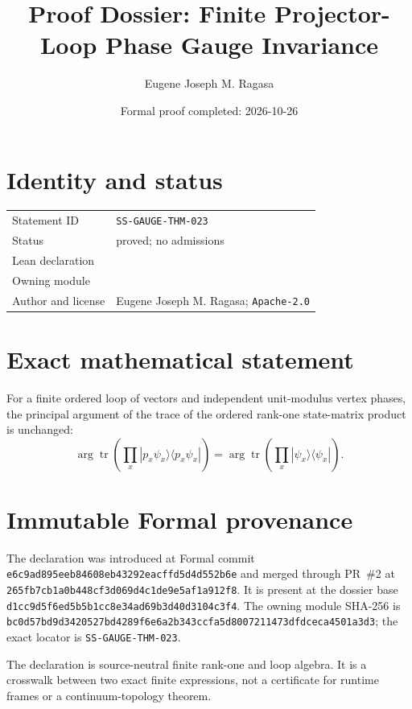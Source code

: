 \documentclass[11pt]{article}
\title{Proof Dossier: Finite Projector-Loop Phase Gauge Invariance}
\author{Eugene Joseph M. Ragasa}
\date{Formal proof completed: 2026-10-26}
\begin{document}
\raggedright
\maketitle

\section{Identity and status}
\begin{tabularx}{\textwidth}{@{}lY@{}}
\toprule
Statement ID & \texttt{SS-GAUGE-THM-023} \\
Status & proved; no admissions \\
Lean declaration &  \\
Owning module &  \\
Author and license & Eugene Joseph M. Ragasa; \texttt{Apache-2.0} \\
\bottomrule
\end{tabularx}

\section{Exact mathematical statement}
For a finite ordered loop of vectors and independent unit-modulus vertex phases, the principal argument of the trace of the ordered rank-one state-matrix product is unchanged:
\[
 \arg\operatorname{tr}\!\left(\prod_x |p_x\psi_x\rangle\langle p_x\psi_x|\right)
 =\arg\operatorname{tr}\!\left(\prod_x |\psi_x\rangle\langle\psi_x|\right).
\]

\section{Immutable Formal provenance}
The declaration was introduced at Formal commit
\texttt{e6c9ad895eeb84608eb43292eacffd5d4d552b6e} and merged through PR~\#2 at
\texttt{265fb7cb1a0b448cf3d069d4c1de9e5af1a912f8}.  It is present at the dossier base
\texttt{d1cc9d5f6ed5b5b1cc8e34ad69b3d40d3104c3f4}.  The owning module SHA-256 is
\texttt{bc0d57bd9d3420527bd4289f6e6a2b343ccfa5d8007211473dfdceca4501a3d3}; the exact locator is \texttt{SS-GAUGE-THM-023}.

The declaration is source-neutral finite rank-one and loop algebra.  It is a crosswalk between two exact finite expressions, not a certificate for runtime frames or a continuum-topology theorem.
\end{document}
